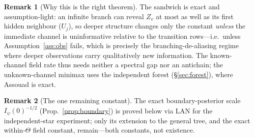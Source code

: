 \documentclass[11pt]{article}
\theoremstyle{plain}
\theoremstyle{definition}\newtheorem{assumption}{Assumption}\newtheorem{remark}{Remark}
\begin{document}
\begin{remark}[Why this is the right theorem]
The sandwich is exact and assumption-light: an infinite branch can reveal $Z_v$ at most as well as its first hidden
neighbour ($U_j$), so deeper structure changes only the constant \emph{unless} the immediate channel is
uninformative relative to the transition rows---i.e.\ unless Assumption~\ref{ass:obs} fails, which is precisely the
branching-de-aliasing regime where deeper observations carry qualitatively new information. The known-channel
field rate thus needs neither a spectral gap nor an antichain; the unknown-channel minimax uses the independent
forest (\S\ref{sec:forest}), where Assouad is exact.
\end{remark}
\begin{remark}[The one remaining constant]
The exact boundary-posterior scale $I_\psi(0)^{-1/2}$ (Prop.~\ref{prop:boundary}) is proved below via LAN for the
independent-star experiment; only its extension to the general tree, and the exact within-$\Theta$ field constant,
remain---both constants, not existence.
\end{remark}
\end{document}
